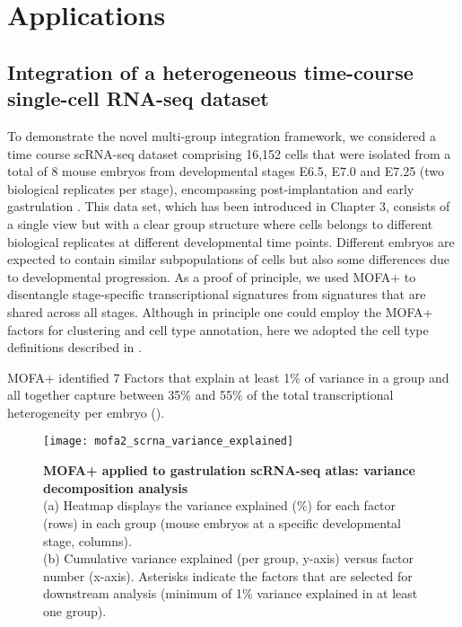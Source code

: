 \section{Applications}

\subsection{Integration of a heterogeneous time-course single-cell RNA-seq dataset}

To demonstrate the novel multi-group integration framework, we considered a time course scRNA-seq dataset comprising 16,152 cells that were isolated from a total of 8 mouse embryos from developmental stages E6.5, E7.0 and E7.25 (two biological replicates per stage), encompassing post-implantation and early gastrulation \cite{Pijuan-Sala2019}. This data set, which has been introduced in Chapter 3, consists of a single view but with a clear group structure where cells belongs to different biological replicates at different developmental time points. Different embryos are expected to contain similar subpopulations of cells but also some differences due to developmental progression. As a proof of principle, we used MOFA+ to disentangle stage-specific transcriptional signatures from signatures that are shared across all stages. Although in principle one could employ the MOFA+ factors for clustering and cell type annotation, here we adopted the cell type definitions described in \cite{Pijuan-Sala2019}.

MOFA+ identified 7 Factors that explain at least 1\% of variance in a group and all together capture between 35\% and 55\% of the total transcriptional heterogeneity per embryo ().

\begin{figure}[H]
	\centering
	\texttt{[image: mofa2\_scrna\_variance\_explained]}
	\caption[]{
	\textbf{MOFA+ applied to gastrulation scRNA-seq atlas: variance decomposition analysis} \\
	(a) Heatmap displays the variance explained (\%) for each factor (rows) in each group (mouse embryos at a specific developmental stage, columns).\\
	(b) Cumulative variance explained (per group, y-axis) versus factor number (x-axis). Asterisks indicate the factors that are selected for downstream analysis (minimum of 1\% variance explained in at least one group).
	}
	\label{fig:mofa2_scrna_variance_explained}
\end{figure}


